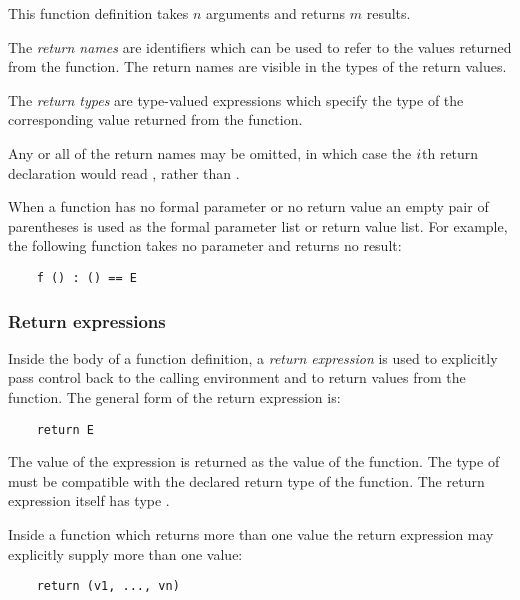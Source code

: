 This function definition takes $n$ arguments and returns $m$ results.

The {\em return names\/} are identifiers which can be used 
to refer to the values returned from the function.
The return names are visible in the types of the return values.

The {\em return types} are type-valued expressions which specify
the type of the corresponding value returned from the function.

Any or all of the return names may be omitted,
in which case the $i\/$th return declaration would read ,
rather than .

When a function has no formal parameter or no return value
an empty pair of parentheses is used as the formal parameter list
or return value list.
For example, the following function takes no parameter and
returns no result:

\begin{small}
\begin{verbatim}
    f () : () == E
\end{verbatim}
\end{small}

\subsubsection{Return expressions}

Inside the body of a function definition, a {\em return expression\/} is
used to explicitly pass control back to the calling environment and to
return values from the function.
The general form of the return expression is:

\begin{small}
\begin{verbatim}
    return E
\end{verbatim}
\end{small}

The value of the expression  is returned as the value
of the function.  The type of  must be compatible with
the declared return type of the function.  The return expression
itself has type .

Inside a function which returns more than one value the return expression
may explicitly supply more than one value:

\begin{small}
\begin{verbatim}
    return (v1, ..., vn)
\end{verbatim}
\end{small}

